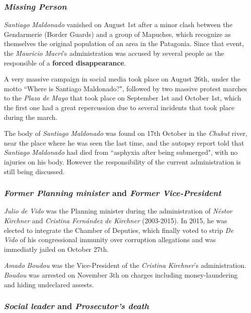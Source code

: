 \documentclass[10pt,letterpaper]{article}
\begin{document}
\subsubsection*{\emph{Missing Person}}
\par \emph{Santiago Maldonado} vanished on August 1st after a minor clash between the Gendarmerie (Border Guards) and a group of Mapuches, which recognize as themselves the original population of an area in the Patagonia.
Since that event, the \emph{Mauricio Macri}'s administration was accused by several people as the responsible of a \textbf{forced disappearance}. 
\par A very massive campaign in social media took place on August 26th, under the motto ``Where is Santiago Maldonado?", followed by two massive protest marches to the \emph{Plaza de Mayo} that took place on September 1st and October 1st, which the first one had a great repercussion due to several incidents that took place during the march.
\par The body of \emph{Santiago Maldonado} was found on 17th October in the \emph{Chubut} river, near the place where he was seen the last time, and the autopsy report told that \emph{Santiago Maldonado} had died from ``asphyxia after being submerged", with no injuries on his body. 
However the responsibility of the current administration is still being discussed.

\subsubsection*{\emph{Former Planning minister} and \emph{Former Vice-President}}

\par \emph{Julio de Vido} was the Planning minister during the administration of \emph{N\'estor Kirchner} and \emph{Cristina Fern\'andez de Kirchner} (2003-2015). In 2015, he was elected to integrate the Chamber of Deputies, which finally voted to strip \emph{De Vido} of his congressional immunity over corruption allegations and was immediatly jailed on October 27th.

\par \emph{Amado Boudou} was the Vice-President of the \emph{Cristina Kirchner}'s administration.
\emph{Boudou} was arrested on November 3th on charges including money-laundering and hiding undeclared assests.

\subsubsection*{\emph{Social leader} and \emph{Prosecutor's death}}
\end{document}
